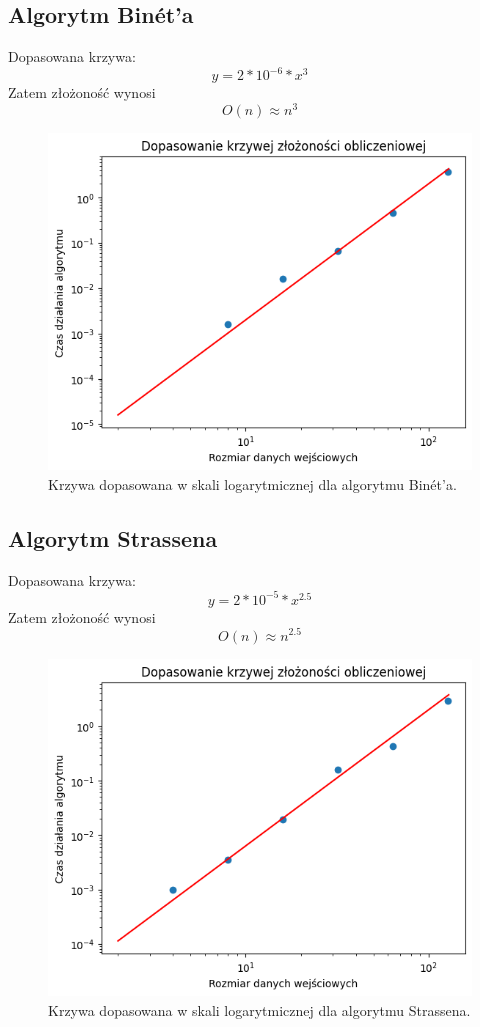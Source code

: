 \documentclass[11pt, leqno]{scrartcl}
\begin{document}
    \subsection{Algorytm Binét'a}
    Dopasowana krzywa:
    \[
        y=2*10^{-6}*x^3
    \]
    Zatem złożoność wynosi
    \[
        O(n) \approx n^3
    \]
    \begin{figure}[H]
        \centering
        \includegraphics[width=0.8\linewidth]{zlozonosc_binet.png}
        \caption{Krzywa dopasowana w skali logarytmicznej dla
            algorytmu Binét'a.}
    \end{figure}

    \subsection{Algorytm Strassena}
    Dopasowana krzywa:
    \[
        y=2*10^{-5}*x^{2.5}
    \]
    Zatem złożoność wynosi
    \[
        O(n) \approx n^{2.5}
    \]
    \begin{figure}[H]
        \centering
        \includegraphics[width=0.8\linewidth]{zlozonosc_strassen.png}
        \caption{Krzywa dopasowana w skali logarytmicznej dla
            algorytmu Strassena.}
    \end{figure}
\end{document}
